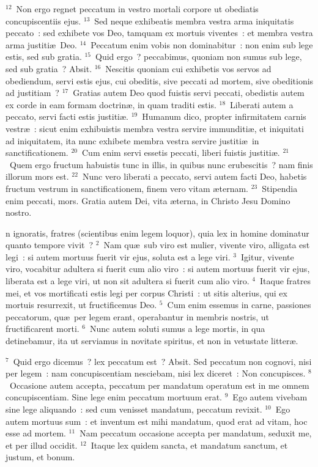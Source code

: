 ${}^{12}$~Non ergo regnet peccatum in vestro mortali corpore ut obediatis concupiscentiis ejus.
${}^{13}$~Sed neque exhibeatis membra vestra arma iniquitatis peccato~: sed exhibete vos Deo, tamquam ex mortuis viventes~: et membra vestra arma justiti\ae\ Deo.
${}^{14}$~Peccatum enim vobis non dominabitur~: non enim sub lege estis, sed sub gratia.
${}^{15}$~Quid ergo~? peccabimus, quoniam non sumus sub lege, sed sub gratia~? Absit.
${}^{16}$~Nescitis quoniam cui exhibetis vos servos ad obediendum, servi estis ejus, cui obeditis, sive peccati ad mortem, sive obeditionis ad justitiam~?
${}^{17}$~Gratias autem Deo quod fuistis servi peccati, obedistis autem ex corde in eam formam doctrin\ae , in quam traditi estis.
${}^{18}$~Liberati autem a peccato, servi facti estis justiti\ae .
${}^{19}$~Humanum dico, propter infirmitatem carnis vestr\ae~: sicut enim exhibuistis membra vestra servire immunditi\ae , et iniquitati ad iniquitatem, ita nunc exhibete membra vestra servire justiti\ae\ in sanctificationem.
${}^{20}$~Cum enim servi essetis peccati, liberi fuistis justiti\ae .
${}^{21}$~Quem ergo fructum habuistis tunc in illis, in quibus nunc erubescitis~? nam finis illorum mors est.
${}^{22}$~Nunc vero liberati a peccato, servi autem facti Deo, habetis fructum vestrum in sanctificationem, finem vero vitam \ae ternam.
${}^{23}$~Stipendia enim peccati, mors. Gratia autem Dei, vita \ae terna, in Christo Jesu Domino nostro.

\bchapter
{}n ignoratis, fratres (scientibus enim legem loquor), quia lex in homine dominatur quanto tempore vivit~?
${}^{2}$~Nam qu\ae\ sub viro est mulier, vivente viro, alligata est legi~: si autem mortuus fuerit vir ejus, soluta est a lege viri.
${}^{3}$~Igitur, vivente viro, vocabitur adultera si fuerit cum alio viro~: si autem mortuus fuerit vir ejus, liberata est a lege viri, ut non sit adultera si fuerit cum alio viro.
${}^{4}$~Itaque fratres mei, et vos mortificati estis legi per corpus Christi~: ut sitis alterius, qui ex mortuis resurrexit, ut fructificemus Deo.
${}^{5}$~Cum enim essemus in carne, passiones peccatorum, qu\ae\ per legem erant, operabantur in membris nostris, ut fructificarent morti.
${}^{6}$~Nunc autem soluti sumus a lege mortis, in qua detinebamur, ita ut serviamus in novitate spiritus, et non in vetustate litter\ae .


${}^{7}$~Quid ergo dicemus~? lex peccatum est~? Absit. Sed peccatum non cognovi, nisi per legem~: nam concupiscentiam nesciebam, nisi lex diceret~: Non concupisces.
${}^{8}$~Occasione autem accepta, peccatum per mandatum operatum est in me omnem concupiscentiam. Sine lege enim peccatum mortuum erat.
${}^{9}$~Ego autem vivebam sine lege aliquando~: sed cum venisset mandatum, peccatum revixit.
${}^{10}$~Ego autem mortuus sum~: et inventum est mihi mandatum, quod erat ad vitam, hoc esse ad mortem.
${}^{11}$~Nam peccatum occasione accepta per mandatum, seduxit me, et per illud occidit.
${}^{12}$~Itaque lex quidem sancta, et mandatum sanctum, et justum, et bonum.


